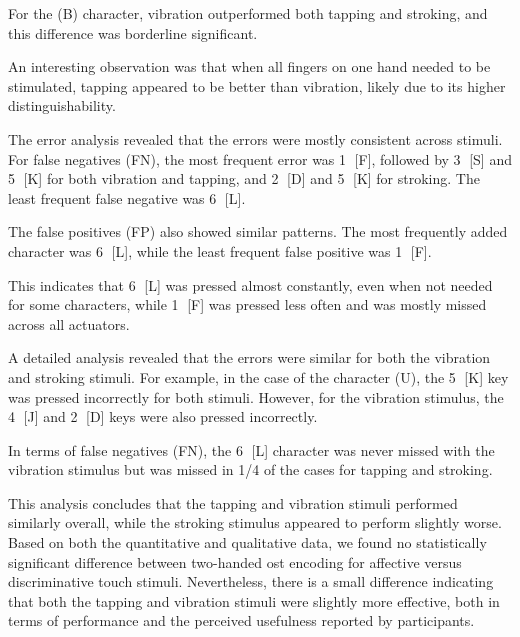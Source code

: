 For the  (B) character, vibration outperformed both tapping and stroking, and this difference was borderline significant.

An interesting observation was that when all fingers on one hand needed to be stimulated, tapping appeared to be better than vibration, likely due to its higher distinguishability.





The error analysis revealed that the errors were mostly consistent across stimuli. For false negatives (FN), the most frequent error was \textcircled{1} [F], followed by \textcircled{3} [S] and \textcircled{5} [K] for both vibration and tapping, and \textcircled{2} [D] and \textcircled{5} [K] for stroking. The least frequent false negative was \textcircled{6} [L].

The false positives (FP) also showed similar patterns. The most frequently added character was \textcircled{6} [L], while the least frequent false positive was \textcircled{1} [F].

This indicates that \textcircled{6} [L] was pressed almost constantly, even when not needed for some characters, while \textcircled{1} [F] was pressed less often and was mostly missed across all actuators.

A detailed analysis revealed that the errors were similar for both the vibration and stroking stimuli. For example, in the case of the character (U), the \textcircled{5} [K] key was pressed incorrectly for both stimuli. However, for the vibration stimulus, the \textcircled{4} [J] and \textcircled{2} [D] keys were also pressed incorrectly.

In terms of false negatives (FN), the \textcircled{6} [L] character was never missed with the vibration stimulus but was missed in 1/4 of the cases for tapping and stroking.

This analysis concludes that the tapping and vibration stimuli performed similarly overall, while the stroking stimulus appeared to perform slightly worse. Based on both the quantitative and qualitative data, we found no statistically significant difference between two-handed \gls{ost} encoding for affective versus discriminative touch stimuli. Nevertheless, there is a small difference indicating that both the tapping and vibration stimuli were slightly more effective, both in terms of performance and the perceived usefulness reported by participants.


